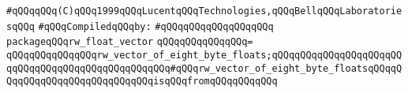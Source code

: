 \label{src/lib/std/rw-float-vector.pkg}
\verb|#qQQqqQQq(C)qQQq1999qQQqLucentqQQqTechnologies,qQQqBellqQQqLaboratoriesqQQq|\newline
\newline
\verb|#qQQqCompiledqQQqby:|\newline
\verb|#qQQqqQQqqQQqqQQqqQQq|\newline
\newline
\verb|packageqQQqrw_float_vector|\newline
\verb|qQQqqQQqqQQqqQQq=|\newline
\verb|qQQqqQQqqQQqqQQqrw_vector_of_eight_byte_floats;qQQqqQQqqQQqqQQqqQQqqQQqqQQqqQQqqQQqqQQqqQQqqQQqqQQq#qQQqrw_vector_of_eight_byte_floatsqQQqqQQqqQQqqQQqqQQqqQQqqQQqqQQqisqQQqfromqQQqqQQqqQQq|\newline
\newline

